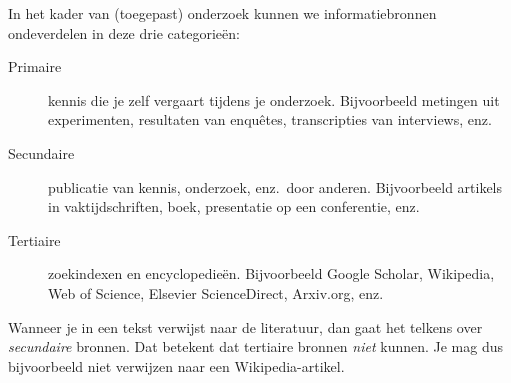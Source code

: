 In het kader van (toegepast) onderzoek kunnen we informatiebronnen ondeverdelen in deze drie categorieën:

\begin{description}
  \item[Primaire] kennis die je zelf vergaart tijdens je onderzoek. Bijvoorbeeld metingen uit experimenten, resultaten van enquêtes, transcripties van interviews, enz.
  \item[Secundaire] publicatie van kennis, onderzoek, enz.~door anderen. Bijvoorbeeld artikels in vaktijdschriften, boek, presentatie op een conferentie, enz.
  \item[Tertiaire] zoekindexen en encyclopedieën. Bijvoorbeeld Google Scholar, Wikipedia, Web of Science, Elsevier ScienceDirect, Arxiv.org, enz.
\end{description}

Wanneer je in een tekst verwijst naar de literatuur, dan gaat het telkens over \emph{secundaire} bronnen. Dat betekent dat tertiaire bronnen \emph{niet} kunnen. Je mag dus bijvoorbeeld niet verwijzen naar een Wikipedia-artikel.


